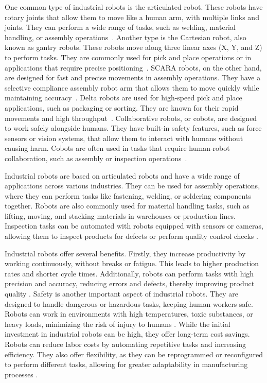 One common type of industrial robots is the articulated robot. These robots have rotary joints that allow them to move like a human arm, with multiple links and joints. They can perform a wide range of tasks, such as welding, material handling, or assembly operations~\cite{Hanafusa.1981, Jain.2019}. Another type is the Cartesian robot, also known as gantry robots. These robots move along three linear axes (X, Y, and Z) to perform tasks. They are commonly used for pick and place operations or in applications that require precise positioning~\cite{Kim.2003}. SCARA robots, on the other hand, are designed for fast and precise movements in assembly operations. They have a selective compliance assembly robot arm that allows them to move quickly while maintaining accuracy~\cite{Das.2005}. Delta robots are used for high-speed pick and place applications, such as packaging or sorting. They are known for their rapid movements and high throughput~\cite{bonev2001delta}. Collaborative robots, or cobots, are designed to work safely alongside humans. They have built-in safety features, such as force sensors or vision systems, that allow them to interact with humans without causing harm. Cobots are often used in tasks that require human-robot collaboration, such as assembly or inspection operations~\cite{Liu.2022b}.

Industrial robots are based on articulated robots and have a wide range of applications across various industries. They can be used for assembly operations, where they can perform tasks like fastening, welding, or soldering components together. Robots are also commonly used for material handling tasks, such as lifting, moving, and stacking materials in warehouses or production lines. Inspection tasks can be automated with robots equipped with sensors or cameras, allowing them to inspect products for defects or perform quality control checks \cite{Hagele.2016}.


Industrial robots offer several benefits. Firstly, they increase productivity by working continuously, without breaks or fatigue. This leads to higher production rates and shorter cycle times. Additionally, robots can perform tasks with high precision and accuracy, reducing errors and defects, thereby improving product quality \cite{Kubela.2016}. Safety is another important aspect of industrial robots. They are designed to handle dangerous or hazardous tasks, keeping human workers safe. Robots can work in environments with high temperatures, toxic substances, or heavy loads, minimizing the risk of injury to humans \cite{Heyer.2010}.
While the initial investment in industrial robots can be high, they offer long-term cost savings. Robots can reduce labor costs by automating repetitive tasks and increasing efficiency. They also offer flexibility, as they can be reprogrammed or reconfigured to perform different tasks, allowing for greater adaptability in manufacturing processes \cite{Jung.2020b}.

